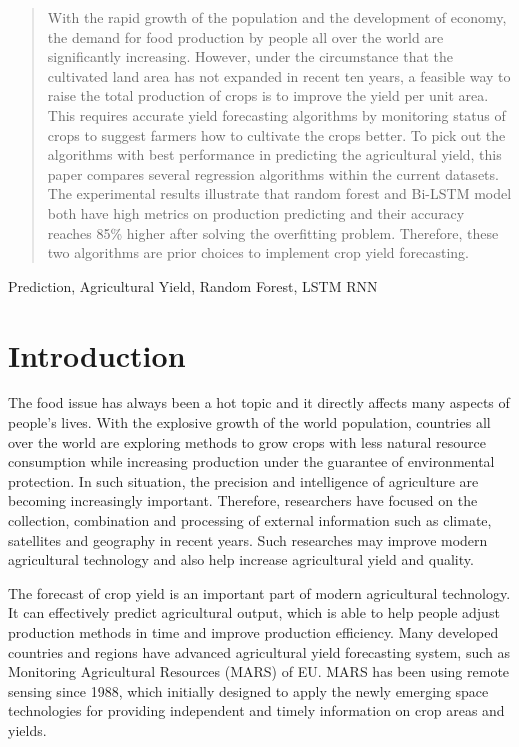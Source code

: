 \documentclass[conference]{IEEEtran}
\begin{document}
\begin{abstract}
  With the rapid growth of the population and the development of economy, the demand for food production by people all over the world are significantly increasing. However, under the circumstance that the cultivated land area has not expanded in recent ten years, a feasible way to raise the total production of crops is to improve the yield per unit area. This requires accurate yield forecasting algorithms by monitoring status of crops to suggest farmers how to cultivate the crops better. To pick out the algorithms with best performance in predicting the agricultural yield, this paper compares several regression algorithms within the current datasets. The experimental results illustrate that random forest and Bi-LSTM model both have high metrics on production predicting and their accuracy reaches 85\% higher after solving the overfitting problem. Therefore, these two algorithms are prior choices to implement crop yield forecasting.
\end{abstract}

\begin{IEEEkeywords}
  Prediction, Agricultural Yield, Random Forest, LSTM RNN
\end{IEEEkeywords}

\section{Introduction}
  The food issue has always been a hot topic and it directly affects many aspects of people's lives. With the explosive growth of the world population, countries all over the world are exploring methods to grow crops with less natural resource consumption while increasing production under the guarantee of environmental protection. In such situation, the precision and intelligence of agriculture are becoming increasingly important. Therefore, researchers have focused on the collection, combination and processing of external information such as climate, satellites and geography in recent years. Such researches may improve modern agricultural technology and also help increase agricultural yield and quality.

  The forecast of crop yield is an important part of modern agricultural technology. It can effectively predict agricultural output, which is able to help people adjust production methods in time and improve production efficiency. Many developed countries and regions have advanced agricultural yield forecasting system, such as Monitoring Agricultural Resources (MARS) of EU\cite{MARS}. MARS has been using remote sensing since 1988, which initially designed to apply the newly emerging space technologies for providing independent and timely information on crop areas and yields. 
  
\end{document}
